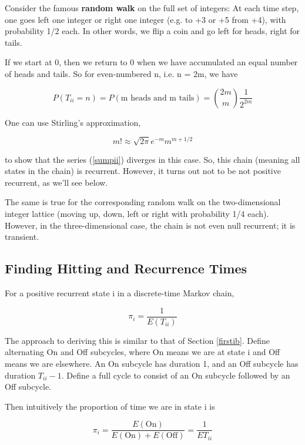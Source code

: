 Consider the famous \textbf{random walk} on the full set of
integers: At each time step, one goes left one integer or right one
integer (e.g.  to +3 or +5 from +4), with probability 1/2 each.  In
other words, we flip a coin and go left for heads, right for tails.

If we start at 0, then we return to 0 when we have accumulated an equal
number of heads and tails.  So for even-numbered n, i.e. n = 2m, we have

\begin{equation}
P(T_{ii} = n) =  P(\textrm {m heads and m tails}) =
\binom{2m}{m} \frac{1}{2^{2m}}
\end{equation}

One can use Stirling's approximation,

\begin{equation}
m! \approx \sqrt{2 \pi} e^{-m} m^{m+1/2}
\end{equation}

to show that the series (\ref{sumpii}) diverges in this case.  So, this
chain (meaning all states in the chain) is recurrent.  However, it turns
out not to be not positive recurrent, as we'll see below. 

The same is true for the corresponding random walk on the
two-dimensional integer lattice (moving up, down, left or right with
probability 1/4 each). However, in the three-dimensional case, the chain
is not even null recurrent; it is transient.

\subsection{Finding Hitting and Recurrence Times}

For a positive recurrent state i in a discrete-time
Markov chain,

\begin{equation}
\label{etii}
\pi_{i}=\frac{1}{E(T_{ii})}
\end{equation}

The approach to deriving this is similar to that of Section
\ref{firstib}.  Define alternating On and Off subcycles, where On means
we are at state i and Off means we are elsewhere.  An On subcycle has
duration 1, and an Off subcycle has duration $T_{ii}-1$.  Define a full
cycle to consist of an On subcycle followed by an Off subcycle.  

Then intuitively the proportion of time we are in state i is 

\begin{equation}
\pi_i = \frac{E(\textrm{On})}{E(\textrm{On}) + E(\textrm{Off})} 
= \frac{1}{ET_{ii}}
\end{equation}

